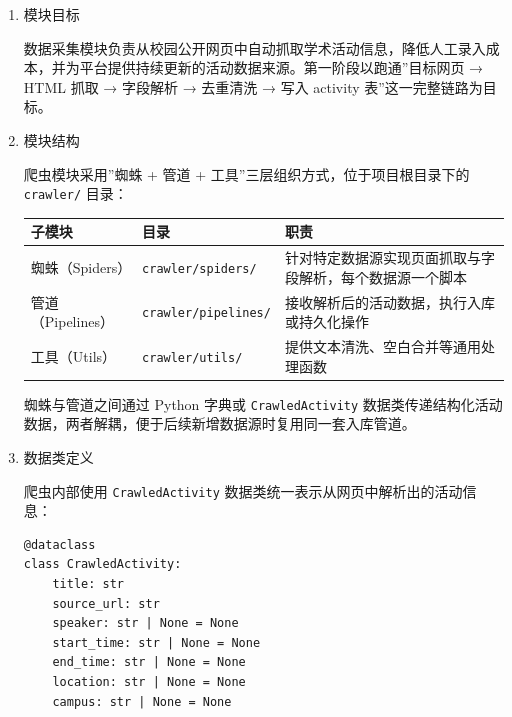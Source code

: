 \documentclass[UTF8,a4paper,12pt,fontset=none]{ctexrep}
\newcounter{none}
\begin{document}
\begin{enumerate}
\def\labelenumi{\arabic{enumi}.}
\item
  模块目标

  数据采集模块负责从校园公开网页中自动抓取学术活动信息，降低人工录入成本，并为平台提供持续更新的活动数据来源。第一阶段以跑通''目标网页 → HTML 抓取 → 字段解析 → 去重清洗 → 写入 activity 表''这一完整链路为目标。
\item
  模块结构

  爬虫模块采用''蜘蛛 + 管道 + 工具''三层组织方式，位于项目根目录下的 \texttt{crawler/} 目录：

  {\def\LTcaptype{none} %
  \begin{longtable}[]{@{}
    >{\raggedright\arraybackslash}p{}
    >{\raggedright\arraybackslash}p{}
    >{\raggedright\arraybackslash}p{}@{}}
  \toprule\noalign{}
  \begin{minipage}[b]{\linewidth}\raggedright
  子模块
  \end{minipage} & \begin{minipage}[b]{\linewidth}\raggedright
  目录
  \end{minipage} & \begin{minipage}[b]{\linewidth}\raggedright
  职责
  \end{minipage} \\
  \midrule\noalign{}
  \endhead
  \bottomrule\noalign{}
  \endlastfoot
  蜘蛛（Spiders） & \texttt{crawler/spiders/} & 针对特定数据源实现页面抓取与字段解析，每个数据源一个脚本 \\
  管道（Pipelines） & \texttt{crawler/pipelines/} & 接收解析后的活动数据，执行入库或持久化操作 \\
  工具（Utils） & \texttt{crawler/utils/} & 提供文本清洗、空白合并等通用处理函数 \\
  \end{longtable}
  }

  蜘蛛与管道之间通过 Python 字典或 \texttt{CrawledActivity} 数据类传递结构化活动数据，两者解耦，便于后续新增数据源时复用同一套入库管道。
\item
  数据类定义

  爬虫内部使用 \texttt{CrawledActivity} 数据类统一表示从网页中解析出的活动信息：

\begin{verbatim}
@dataclass
class CrawledActivity:
    title: str
    source_url: str
    speaker: str | None = None
    start_time: str | None = None
    end_time: str | None = None
    location: str | None = None
    campus: str | None = None
\end{verbatim}


\end{enumerate}
\end{document}
